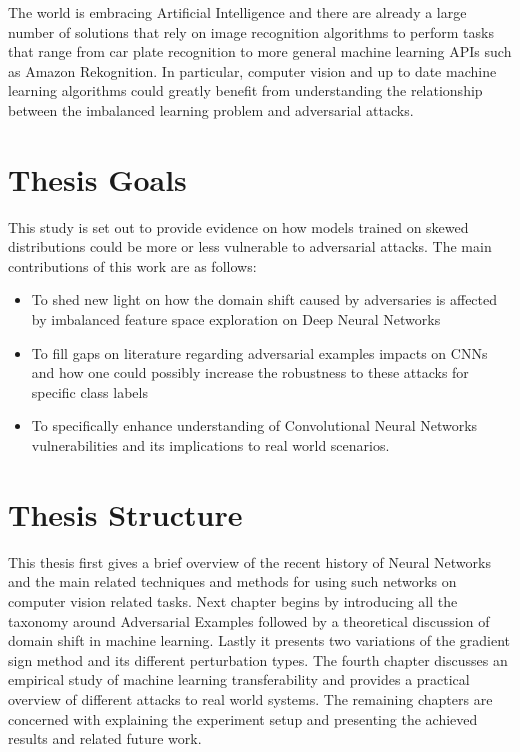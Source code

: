 The world is embracing Artificial Intelligence and there are already a large number of solutions that rely on image recognition algorithms to perform tasks that range from car plate recognition to more general machine learning APIs such as Amazon Rekognition. In particular, computer vision and up to date machine learning algorithms could greatly benefit from understanding the relationship between the imbalanced learning problem and adversarial attacks.

\section{Thesis Goals}
This study is set out to provide evidence on how models trained on skewed distributions could be more or less vulnerable to adversarial attacks. The main contributions of this work are as follows:
\begin{itemize}
	\item To shed new light on how the domain shift caused by adversaries is affected by imbalanced feature space exploration on Deep Neural Networks
	\item To fill gaps on literature regarding adversarial examples impacts on CNNs and how one could possibly increase the robustness to these attacks for specific class labels
	\item To specifically enhance understanding of Convolutional Neural Networks vulnerabilities and its implications to real world scenarios.
\end{itemize}

\section{Thesis Structure}

This thesis first gives a brief overview of the recent history of Neural Networks and the main related techniques and methods for using such networks on computer vision related tasks. Next chapter begins by introducing all the taxonomy around Adversarial Examples followed by a theoretical discussion of domain shift in machine learning. Lastly it presents two variations of the gradient sign method and its different perturbation types. The fourth chapter discusses an empirical study of machine learning transferability and provides a practical overview of different attacks to real world systems. The remaining chapters are concerned with explaining the experiment setup and presenting the achieved results and related future work.
